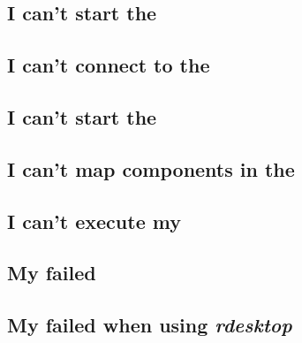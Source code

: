 



\subsection{I can't start the \gdserver}
\label{troublestartserver}


\subsection{I can't connect to the \gdserver}
\label{troubleconnectserver}


\subsection{I can't start the \gdaut{}}
\label{troublestartaut}


\subsection{I can't map components in the \gdomm}
\label{troubleobjectmapping}


\subsection{I can't execute my \gdsuite{}}
\label{troubleexecute}


\subsection{My \gdsuite{} failed}
\label{troublefailed}


\subsection{My \gdsuite{} failed when using \emph{rdesktop}}
\label{troublerdesktop}


